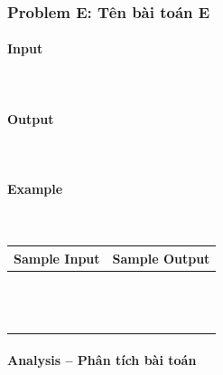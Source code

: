 \documentclass{article}
\begin{document}
\begin{lstlisting}

\end{lstlisting}

\subsubsection{Problem E: Tên bài toán E}


\paragraph{Input} \mbox{} \\



\paragraph{Output}\mbox{} \\


\paragraph{Example}\mbox{} \\

\begin{table}[h]
    \centering
    \begin{tabular}{|l|r|}
        \hline
        \textbf{Sample Input} & \textbf{Sample Output} \\
        \hline
		&  \\ 
		&  \\ 
		&  \\ 
		&  \\ 
		&  \\
		&  \\ 
		&  \\ 
		&  \\ 
		&  \\ 
		&  \\ 
		&  \\ 
		&  \\
		&  \\ \hline
    \end{tabular}
\end{table}

\paragraph{Analysis -- Phân tích bài toán} \mbox{} \\
\end{document}
